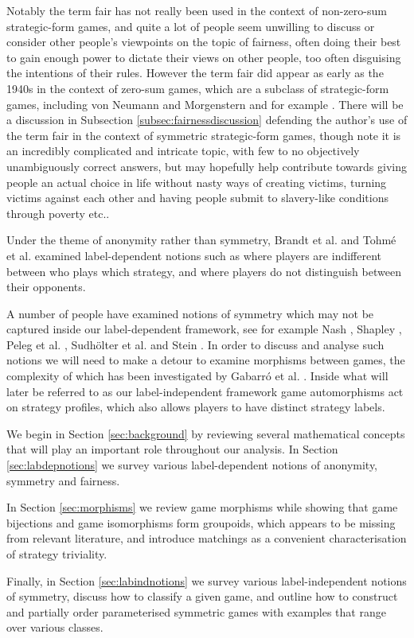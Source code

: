 Notably the term fair has not really been used in the context of non-zero-sum strategic-form games, and quite a lot of people seem unwilling to discuss or consider other people's viewpoints on the topic of fairness, often doing their best to gain enough power to dictate their views on other people, too often disguising the intentions of their rules. However the term fair did appear as early as the 1940s in the context of zero-sum games, which are a subclass of strategic-form games, including von Neumann and Morgenstern \cite[17.11, 28.1, 28.2]{VNM} and for example \cite{gelbaum1959symmetric, tucker1962comb}. There will be a discussion in Subsection \ref{subsec:fairnessdiscussion} defending the author's use of the term fair in the context of symmetric strategic-form games, though note it is an incredibly complicated and intricate topic, with few to no objectively unambiguously correct answers, but may hopefully help contribute towards giving people an actual choice in life without nasty ways of creating victims, turning victims against each other and having people submit to slavery-like conditions through poverty etc..

Under the theme of anonymity rather than symmetry, Brandt et al. \cite{brandt2009symmetries} and Tohm\'e et al. \cite{tohme2019structural} examined label-dependent notions such as where players are indifferent between who plays which strategy, and where players do not distinguish between their opponents.

A number of people have examined notions of symmetry which may not be captured inside our label-dependent framework, see for example Nash \cite{NashNCG}, Shapley \cite{shapley1960symmetric}, Peleg et al. \cite{peleg1999canonical}, Sudh\"{o}lter et al. \cite{sudholter2000canonical} and Stein \cite{NoahXE}. In order to discuss and analyse such notions we will need to make a detour to examine morphisms between games, the complexity of which has been investigated by Gabarr\'{o} et al. \cite{IsoComplexity}. Inside what will later be referred to as our label-independent framework game automorphisms act on strategy profiles, which also allows players to have distinct strategy labels.

We begin in Section \ref{sec:background} by reviewing several mathematical concepts that will play an important role throughout our analysis. In Section \ref{sec:labdepnotions} we survey various label-dependent notions of anonymity, symmetry and fairness. 

In Section \ref{sec:morphisms} we review game morphisms while showing that game bijections and game isomorphisms form groupoids, which appears to be missing from relevant literature, and introduce matchings as a convenient characterisation of strategy triviality. 

Finally, in Section \ref{sec:labindnotions} we survey various label-independent notions of symmetry, discuss how to classify a given game, and outline how to construct and partially order parameterised symmetric games with examples that range over various classes.

